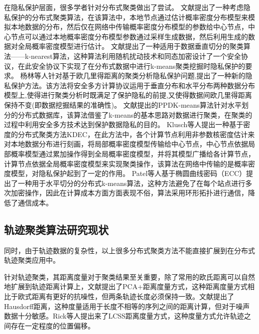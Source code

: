 在隐私保护层面，很多学者针对分布式聚类做出了尝试。
文献\cite{merugu2003privacy}提出了一种考虑隐私保护的分布式聚类算法，在该算法中，本地节点通过估计概率密度分布模型来模拟本地数据的分布，然后仅在网络中传输概率密度分布模型的参数给中心节点，中心节点可以通过本地概率密度分布模型参数通过采样生成数据，然后利用生成的数据对全局概率密度模型进行估计。
文献\cite{张国荣2007分布式环境下保持隐私的聚类挖掘算法}提出了一种适用于数据垂直切分的聚类算法——k-nearest算法，这种算法利用随机扰动技术和同态加密设计了一个安全协议，在此安全协议下实现了在分布式数据中进行k-means聚类挖掘时隐私保护的要求。
杨林等人针对基于欧几里得距离的聚类分析隐私保护问题,提出了一种新的隐私保护方法。该方法将安全多方计算协议运用于垂直分布和水平分布两种数据分布模型上,使得进行聚类分析时既满足了保护隐私的前提,又使得数据间欧几里得距离保持不变(即数据挖掘结果的准确性)。
文献\cite{姚瑶一种基于隐私保护的分布式聚类算法}提出的PPDK-means算法针对水平划分的分布式数据库，该算法借鉴了k-means的基本思路对数据进行聚类，在聚类的过程中利用安全多方技术达到保护数据隐私的目的。
Klusch等人提出一种基于密度的分布式聚类方法KDEC，在此方法中，各个计算节点利用非参数核密度估计来对本地数据分布进行刻画，将局部概率密度模型传输给中心节点，中心节点依据局部概率模型通过累加操作得到全局概率密度模型，并将其模型广播给各计算节点，计算节点依据全局概率密度模型来实现聚类操作，该算法在网络中传输的是概率密度模型，对隐私保护起到了一定的作用。
Patel等人基于椭圆曲线密码（ECC）提出了一种用于水平切分的分布式k-means算法，这种方法避免了在每个站点进行多次加密操作，因此在计算成本方面方面表现不俗，算法采用环形拓扑进行通信，降低了通信成本。


\subsection{轨迹聚类算法研究现状}

同时，由于轨迹数据的复杂性，以上很多分布式聚类方法不能直接扩展到在分布式轨迹聚类应用中。

针对轨迹聚类，其距离度量对于聚类结果至关重要，除了常用的欧氏距离可以自然地扩展到轨迹距离计算上，文献提出了PCA+距离度量方式，这种距离度量方式相比于欧式距离有更好的抗噪性，但两条轨迹长度必须保持一致。文献提出了Hausdorff距离，这种度量适用于长度不相等的序列之间的距离计算，但对于噪声数据十分敏感。Rick等人提出来了LCSS距离度量方式，这种度量方式允许轨迹之间存在一定程度的位置偏移。

